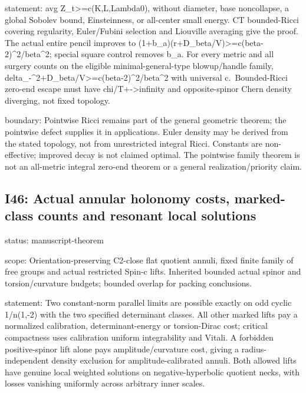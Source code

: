 \documentclass[
  10pt,
]{article}
\begin{document}
statement: avg Z\_t\textgreater=c(K,L,Lambda0), without diameter, base
noncollapse, a global Sobolev bound, Einsteinness, or all-center small
energy. CT bounded-Ricci covering regularity, Euler/Fubini selection and
Liouville averaging give the proof. The actual entire pencil improves to
(1+b\_a)(r+D\_beta/V)\textgreater=c(beta-2)\^{}2/beta\^{}2; special
square control removes b\_a. For every metric and all surgery counts on
the eligible minimal-general-type blowup/handle family,
delta\_-\^{}2+D\_beta/V\textgreater=c(beta-2)\^{}2/beta\^{}2 with
universal c.~Bounded-Ricci zero-end escape must have
chi/T+-\textgreater infinity and opposite-spinor Chern density
diverging, not fixed topology.

boundary: Pointwise Ricci remains part of the general geometric theorem;
the pointwise defect supplies it in applications. Euler density may be
derived from the stated topology, not from unrestricted integral Ricci.
Constants are non-effective; improved decay is not claimed optimal. The
pointwise family theorem is not an all-metric integral zero-end theorem
or a general realization/priority claim.

\hypertarget{i46-actual-annular-holonomy-costs-marked-class-counts-and-resonant-local-solutions}{%
\subsection{I46: Actual annular holonomy costs, marked-class counts and
resonant local
solutions}\label{i46-actual-annular-holonomy-costs-marked-class-counts-and-resonant-local-solutions}}

status: manuscript-theorem

scope: Orientation-preserving C2-close flat quotient annuli, fixed
finite family of free groups and actual restricted Spin-c lifts.
Inherited bounded actual spinor and torsion/curvature budgets; bounded
overlap for packing conclusions.

statement: Two constant-norm parallel limits are possible exactly on odd
cyclic 1/n(1,-2) with the two specified determinant classes. All other
marked lifts pay a normalized calibration, determinant-energy or
torsion-Dirac cost; critical compactness uses calibration uniform
integrability and Vitali. A forbidden positive-spinor lift alone pays
amplitude/curvature cost, giving a radius-independent density exclusion
for amplitude-calibrated annuli. Both allowed lifts have genuine local
weighted solutions on negative-hyperbolic quotient necks, with losses
vanishing uniformly across arbitrary inner scales.
\end{document}
